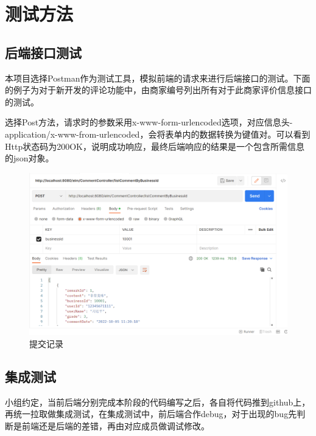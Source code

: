 
\chapter{测试方法}

\section{后端接口测试}

本项目选择Postman作为测试工具，模拟前端的请求来进行后端接口的测试。下面的例子为对于新开发的评论功能中，由商家编号列出所有对于此商家评价信息接口的测试。

选择Post方法，请求时的参数采用x-www-form-urlencoded选项，对应信息头-application/x-www-from-urlencoded，会将表单内的数据转换为键值对。可以看到Http状态码为200OK，说明成功响应，最终后端响应的结果是一个包含所需信息的json对象。

\begin{figure}[H]
    \centering
    \includegraphics[scale=0.3]{figures/7.1.1.png}
    \caption{提交记录}
\end{figure}

\section{集成测试}
小组约定，当前后端分别完成本阶段的代码编写之后，各自将代码推到github上，再统一拉取做集成测试，在集成测试中，前后端合作debug，对于出现的bug先判断是前端还是后端的差错，再由对应成员做调试修改。







